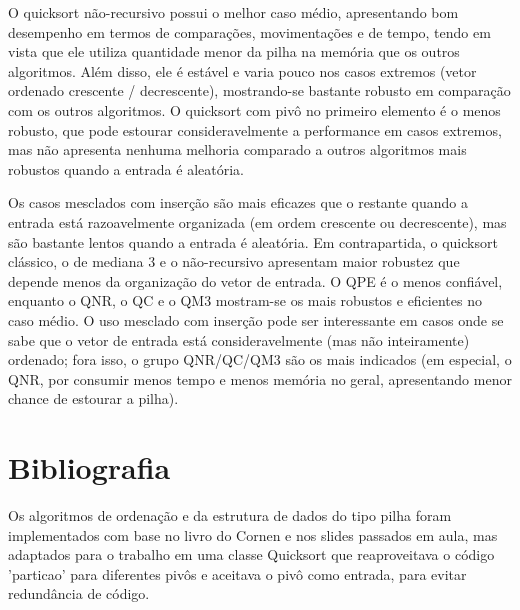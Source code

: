 \documentclass[11pt]{article}
\begin{document}
O quicksort não-recursivo possui o melhor caso médio, apresentando bom
desempenho em termos de comparações, movimentações e de tempo, tendo em
vista que ele utiliza quantidade menor da pilha na memória que os outros
algoritmos. Além disso, ele é estável e varia pouco nos casos extremos
(vetor ordenado crescente / decrescente), mostrando-se bastante robusto
em comparação com os outros algoritmos. O quicksort com pivô no primeiro
elemento é o menos robusto, que pode estourar consideravelmente a
performance em casos extremos, mas não apresenta nenhuma melhoria
comparado a outros algoritmos mais robustos quando a entrada é
aleatória.

Os casos mesclados com inserção são mais eficazes que o restante quando
a entrada está razoavelmente organizada (em ordem crescente ou
decrescente), mas são bastante lentos quando a entrada é aleatória. Em
contrapartida, o quicksort clássico, o de mediana 3 e o não-recursivo
apresentam maior robustez que depende menos da organização do vetor de
entrada. O QPE é o menos confiável, enquanto o QNR, o QC e o QM3
mostram-se os mais robustos e eficientes no caso médio. O uso mesclado
com inserção pode ser interessante em casos onde se sabe que o vetor de
entrada está consideravelmente (mas não inteiramente) ordenado; fora
isso, o grupo QNR/QC/QM3 são os mais indicados (em especial, o QNR, por
consumir menos tempo e menos memória no geral, apresentando menor chance
de estourar a pilha).

    \section{Bibliografia}\label{bibliografia}

Os algoritmos de ordenação e da estrutura de dados do tipo pilha foram
implementados com base no livro do Cornen e nos slides passados em aula,
mas adaptados para o trabalho em uma classe Quicksort que reaproveitava
o código 'particao' para diferentes pivôs e aceitava o pivô como
entrada, para evitar redundância de código.


    
    
    
    
\end{document}
